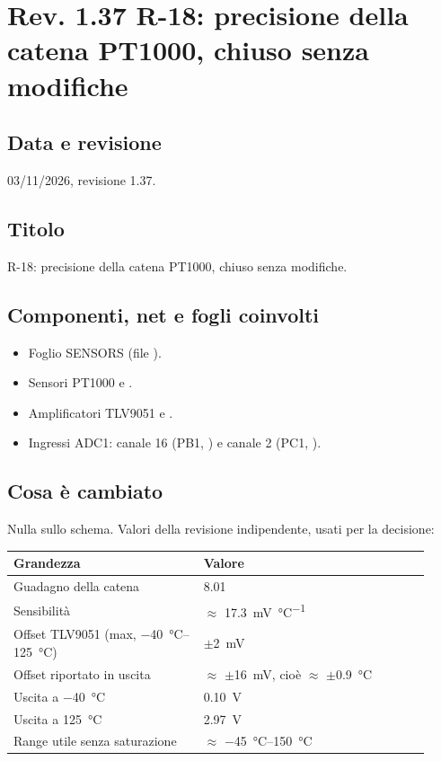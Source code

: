 \clearpage
\section[Rev. 1.37 -- R-18: precisione della catena PT1000]{Rev. 1.37 \textendash{} R-18: precisione della catena PT1000, chiuso senza modifiche}

\subsection{Data e revisione}
03/11/2026, revisione 1.37.

\subsection{Titolo}
R-18: precisione della catena PT1000, chiuso senza modifiche.

\subsection{Componenti, net e fogli coinvolti}
\begin{itemize}
\item Foglio SENSORS (file ).
\item Sensori PT1000  e .
\item Amplificatori TLV9051  e .
\item Ingressi ADC1: canale 16 (PB1, ) e canale 2 (PC1, ).
\end{itemize}

\subsection{Cosa è cambiato}
Nulla sullo schema. Valori della revisione indipendente, usati per la decisione:

{\small{}
\begin{tabular}{@{}p{0.42\linewidth}p{0.5\linewidth}@{}}
\toprule
\textbf{Grandezza} & \textbf{Valore}\\
\midrule
Guadagno della catena & \num{8,01}\\
Sensibilità & $\approx$ \SI{17,3}{\milli\volt\per\celsius}\\
Offset TLV9051 (max, \SIrange{-40}{125}{\celsius}) & $\pm$\SI{2}{\milli\volt}\\
Offset riportato in uscita & $\approx$ $\pm$\SI{16}{\milli\volt}, cioè $\approx$ $\pm$\SI{0,9}{\celsius}\\
Uscita a \SI{-40}{\celsius} & \SI{0,10}{\volt}\\
Uscita a \SI{+125}{\celsius} & \SI{2,97}{\volt}\\
Range utile senza saturazione & $\approx$ \SIrange{-45}{150}{\celsius}\\
\bottomrule
\end{tabular}}

